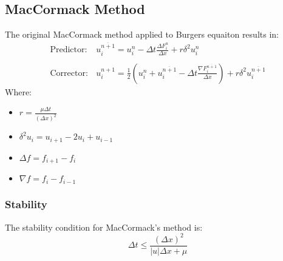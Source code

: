 \documentclass[11pt, a4paper]{article}
\begin{document}
\subsection{MacCormack Method}
The original MacCormack method applied to Burgers equaiton results in:
\begin{equation}
    \begin{array}{cc}
        \displaystyle\mathrm{Predictor:} & \displaystyle u_i^{\overline{n+1}}=u_i^n-\Delta t\frac{\Delta F_i^n}{\Delta x}+r\delta^2u_i^n \\\\ 
        \displaystyle\mathrm{Corrector:} & \displaystyle u_i^{n+1}=\frac{1}{2}\left(u_i^n+u_i^{\overline{n+1}}-\Delta t\frac{\nabla F_i^{\overline{n+1}}}{\Delta x}\right)+r\delta^2u_i^{\overline{n+1}}
    \end{array}
\end{equation}
Where:
\begin{itemize}
    \item $\displaystyle r=\frac{\mu\Delta t}{\left(\Delta x\right)^2}$
    \item $\displaystyle \delta^2u_i=u_{i+1}-2u_i+u_{i-1}$
    \item $\Delta f=f_{i+1}-f_i$
    \item $\nabla f=f_i-f_{i-1}$
\end{itemize}

\subsubsection{Stability}
The stability condition for MacCormack's method is:
\begin{equation}
    \Delta t\le\frac{\left(\Delta x\right)^2}{\left|u\right|\Delta x+\mu}
\end{equation}
\end{document}
